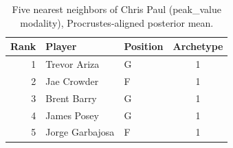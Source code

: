\begin{table}[htbp]
  \centering\small
  \begin{tabular}{rllc}
    \toprule
    Rank & Player & Position & Archetype \\
    \midrule
    1 & Trevor Ariza & G & 1 \\
    2 & Jae Crowder & F & 1 \\
    3 & Brent Barry & G & 1 \\
    4 & James Posey & G & 1 \\
    5 & Jorge Garbajosa & F & 1 \\
    \bottomrule
  \end{tabular}
  \caption{Five nearest neighbors of Chris Paul (peak_value modality), Procrustes-aligned posterior mean.}
  \label{tab:Chris_Paul_neighbors_peak_value}
\end{table}

